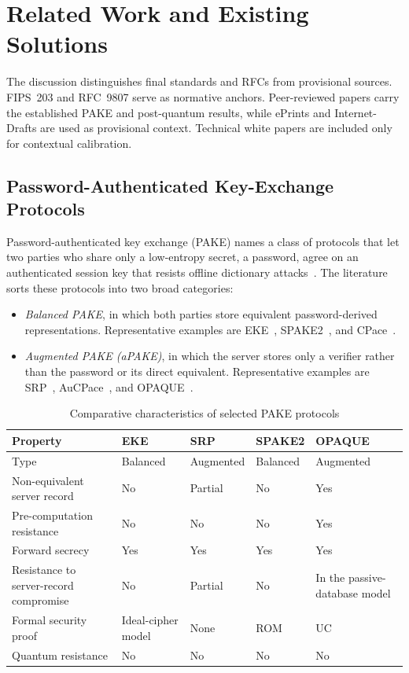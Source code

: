 \documentclass{ieeeijc}
\theoremstyle{remark}
\begin{document}
\section{Related Work and Existing Solutions}

The discussion distinguishes final standards and RFCs from provisional sources.
FIPS~203 and RFC~9807 serve as normative anchors. Peer-reviewed papers carry
the established PAKE and post-quantum results, while ePrints and Internet-Drafts
are used as provisional context. Technical white papers are included only for
contextual calibration.

\subsection{Password-Authenticated Key-Exchange Protocols}

Password-authenticated key exchange (PAKE) names a class of protocols that
let two parties who share only a low-entropy secret, a password, agree on
an authenticated session key that resists offline dictionary
attacks~\cite{boyko2000}. The literature sorts these protocols into two
broad categories:

\begin{itemize}
  \item \emph{Balanced PAKE}, in which both parties store equivalent
        password-derived representations. Representative examples are
        EKE~\cite{bellovin1992}, SPAKE2~\cite{ladd2023}, and
        CPace~\cite{haase2019}.
  \item \emph{Augmented PAKE (aPAKE)}, in which the server stores only a
        verifier rather than the password or its direct equivalent.
        Representative examples are SRP~\cite{wu1998},
        AuCPace~\cite{haase2019}, and OPAQUE~\cite{jarecki2018}.
\end{itemize}

\begin{table}[t]
\caption{Comparative characteristics of selected PAKE protocols}
\label{tab:pake-comparison}
\centering\scriptsize
\begin{tabularx}{\textwidth}{@{}L{3.5cm}>{\centering\arraybackslash}X>{\centering\arraybackslash}X>{\centering\arraybackslash}X>{\centering\arraybackslash}X@{}}
\toprule
Property & EKE & SRP & SPAKE2 & OPAQUE \\
\midrule
Type & Balanced & Augmented & Balanced & Augmented \\
Non-equivalent server record & No & Partial & No & Yes \\
Pre-computation resistance & No & No & No & Yes \\
Forward secrecy & Yes & Yes & Yes & Yes \\
Resistance to server-record compromise & No & Partial & No & In the passive-database model \\
Formal security proof & Ideal-cipher model & None & ROM & UC \\
Quantum resistance & No & No & No & No \\
\bottomrule
\end{tabularx}
\end{table}
\end{document}
